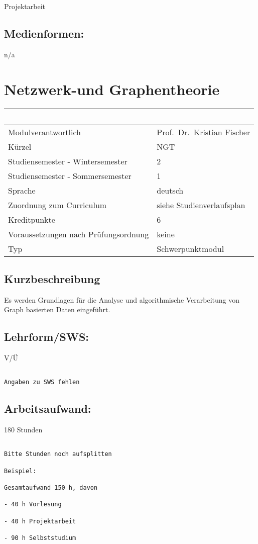 Projektarbeit

\section*{Medienformen:}\label{medienformen-16}

n/a

\chapter{Netzwerk-und Graphentheorie}\label{netzwerk-und-graphentheorie}

\begin{longtable}[]{@{}ll@{}}
\toprule
~ & ~\tabularnewline
\midrule
\endhead
Modulverantwortlich & Prof.~Dr.~Kristian Fischer\tabularnewline
Kürzel & NGT\tabularnewline
Studiensemester - Wintersemester & 2\tabularnewline
Studiensemester - Sommersemester & 1\tabularnewline
Sprache & deutsch\tabularnewline
Zuordnung zum Curriculum & siehe Studienverlaufsplan\tabularnewline
Kreditpunkte & 6\tabularnewline
Voraussetzungen nach Prüfungsordnung & keine\tabularnewline
Typ & Schwerpunktmodul\tabularnewline
\bottomrule
\end{longtable}

\section*{Kurzbeschreibung}\label{kurzbeschreibung-11}

Es werden Grundlagen für die Analyse und algorithmische Verarbeitung von
Graph basierten Daten eingeführt.

\section*{Lehrform/SWS:}\label{lehrformsws-17}

V/Ü

\begin{verbatim}

Angaben zu SWS fehlen
\end{verbatim}

\section*{Arbeitsaufwand:}\label{arbeitsaufwand-17}

180 Stunden

\begin{verbatim}

Bitte Stunden noch aufsplitten

Beispiel:

Gesamtaufwand 150 h, davon 

- 40 h Vorlesung 

- 40 h Projektarbeit  

- 90 h Selbststudium 
\end{verbatim}

